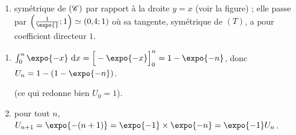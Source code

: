 \begin{description}
\begin{enumerate}
\begin{enumerate}
					\item {} symétrique de $(\mathscr{C})$ par rapport à la droite $y = x$ (voir la figure) ;
						elle passe par $\left(\frac{1}{\expo{}};1\right) \simeq (0{,}4;1)$ où sa tangente, symétrique de $(T)$, a pour coefficient directeur $1$.
				\end{enumerate}
			\end{enumerate}
		\item[B.]
			\begin{enumerate}
				\item {}
					$\int_0^n\expo{-x}\dx = \Big[-\expo{-x}\Big]_0^n = 1 - \expo{-n}$, donc $U_n = 1 - \left(1 - \expo{-n}\right)$.

					 (ce qui redonne bien $U_0 = 1$).
				\item {}
					pour tout $n$, $U_{n+1} = \expo{-(n+1)} = \expo{-1}\times\expo{-n} = \expo{-1}U_n$.

			\end{enumerate}
	\end{description}
